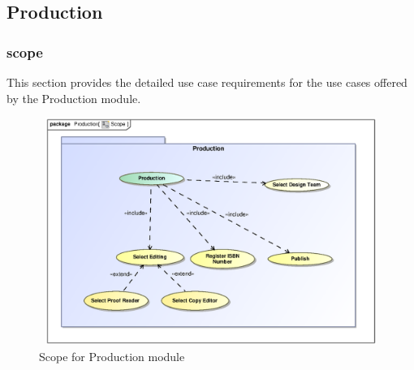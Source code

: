 \subsection{Production}

\subsubsection{scope}
\par{This section provides the detailed use case requirements for the use cases offered by the Production
module.}

\begin{figure}[h]
	\includegraphics[height=280px, width=500px]{epsImages/Production/Scope.eps}
	\caption{Scope for Production module}
\end{figure}

\newpage
